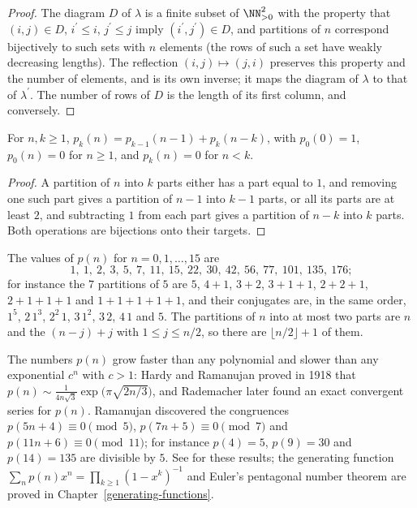 \begin{proof}
The diagram $D$ of $\lambda$ is a finite subset of $\NN_{>0}^2$ with the property that $(i, j) \in D$, $i^{\prime} \leq i$, $j^{\prime} \leq j$ imply $(i^{\prime}, j^{\prime}) \in D$, and partitions of $n$
correspond bijectively to such sets with $n$ elements (the rows of such a set have weakly decreasing lengths). The reflection $(i, j) \mapsto (j, i)$ preserves this property and the number of elements,
and is its own inverse; it maps the diagram of $\lambda$ to that of $\lambda^{\prime}$. The number of rows of $D$ is the length of its first column, and conversely.
\end{proof}

\begin{proposition}\label{combinatorics:proposition-partition-recurrence}
For $n, k \geq 1$, $p_k(n) = p_{k-1}(n - 1) + p_k(n - k)$, with $p_0(0) = 1$, $p_0(n) = 0$ for $n \geq 1$, and $p_k(n) = 0$ for $n < k$.
\end{proposition}

\begin{proof}
A partition of $n$ into $k$ parts either has a part equal to $1$, and removing one such part gives a partition of $n - 1$ into $k - 1$ parts, or all its parts are at least $2$, and subtracting $1$ from
each part gives a partition of $n - k$ into $k$ parts. Both operations are bijections onto their targets.
\end{proof}

\begin{example}\label{combinatorics:example-partition-values}
The values of $p(n)$ for $n = 0, 1, \ldots, 15$ are
\[
1, \ 1, \ 2, \ 3, \ 5, \ 7, \ 11, \ 15, \ 22, \ 30, \ 42, \ 56, \ 77, \ 101, \ 135, \ 176;
\]
for instance the $7$ partitions of $5$ are $5$, $4 + 1$, $3 + 2$, $3 + 1 + 1$,
$2 + 2 + 1$, $2 + 1 + 1 + 1$ and $1 + 1 + 1 + 1 + 1$, and their conjugates are, in the same order, $1^5$, $2\,1^3$, $2^2\,1$, $3\,1^2$, $3\,2$, $4\,1$ and $5$. The partitions of $n$ into at most two parts
are $n$ and the $(n - j) + j$ with $1 \leq j \leq n/2$, so there are $\lfloor n/2 \rfloor + 1$ of them.
\end{example}

\begin{remark}\label{combinatorics:remark-hardy-ramanujan}
The numbers $p(n)$ grow faster than any polynomial and slower than any exponential $c^n$ with $c > 1$: Hardy and Ramanujan proved in 1918 that
$p(n) \sim \frac{1}{4n\sqrt3}\exp\bigl(\pi\sqrt{2n/3}\bigr)$, and Rademacher later found an exact convergent series for $p(n)$. Ramanujan discovered the congruences $p(5n + 4) \equiv 0 \pmod 5$,
$p(7n + 5) \equiv 0 \pmod 7$ and $p(11n + 6) \equiv 0 \pmod{11}$; for instance $p(4) = 5$, $p(9) = 30$ and $p(14) = 135$ are divisible by $5$. See \cite{andrews-partitions} for these results; the
generating function $\sum_np(n)x^n = \prod_{k \geq 1}(1 - x^k)^{-1}$ and Euler's pentagonal number theorem are proved in Chapter~\ref{generating-functions}.
\end{remark}

